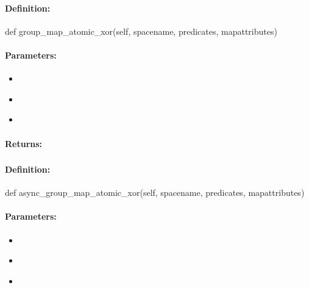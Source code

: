 \paragraph{Definition:}
\begin{pythoncode}
def group_map_atomic_xor(self, spacename, predicates, mapattributes)
\end{pythoncode}

\paragraph{Parameters:}
\begin{itemize}[noitemsep]
\item {}\\

\item {}\\

\item {}\\

\end{itemize}

\paragraph{Returns:}


\pagebreak
\subsubsection{}
\label{api:python:async_group_map_atomic_xor}


\paragraph{Definition:}
\begin{pythoncode}
def async_group_map_atomic_xor(self, spacename, predicates, mapattributes)
\end{pythoncode}

\paragraph{Parameters:}
\begin{itemize}[noitemsep]
\item {}\\

\item {}\\

\item {}\\

\end{itemize}

